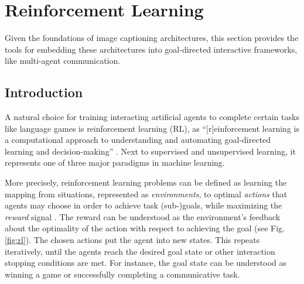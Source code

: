 \section{Reinforcement Learning}
\label{rl}

Given the foundations of image captioning architectures, this section provides the tools for embedding these architectures into goal-directed interactive frameworks, like multi-agent communication.

\subsection{Introduction}
A natural choice for training interacting artificial agents to complete certain tasks like language games is reinforcement learning (RL), as ``[r]einforcement learning is a computational approach to understanding and automating goal-directed learning and decision-making'' \parencite[][p.15]{sutton2018reinforcement}. Next to supervised and unsupervised learning, it represents one of three major paradigms in machine learning. 

More precisely, reinforcement learning problems can be defined as learning the mapping from situations, represented as \textit{environments}, to optimal \textit{actions} that agents may choose in order to achieve task (sub-)goals, while maximizing the \textit{reward} signal \parencite{sutton2018reinforcement}. The reward can be understood as the environment's feedback about the optimality of the action with respect to achieving the goal (see Fig. \ref{fig:rl}). The chosen actions put the agent into new states. This repeats iteratively, until the agents reach the desired goal state or other interaction stopping conditions are met. For instance, the goal state can be understood as winning a game or successfully completing a communicative task. 

